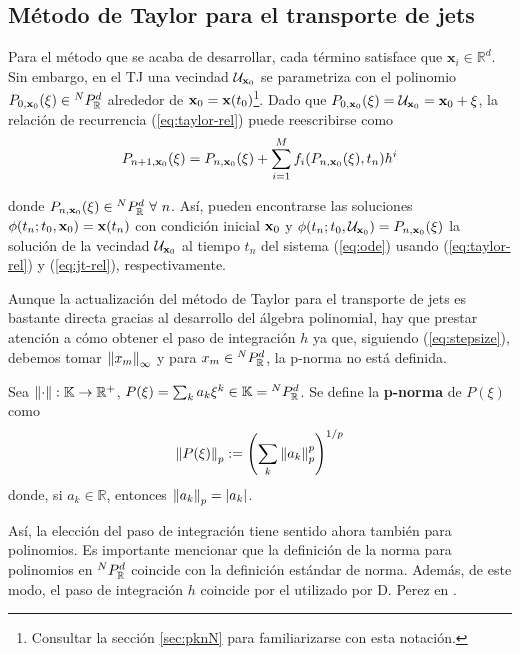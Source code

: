 \subsection{Método de Taylor para el transporte de jets}
Para el método que se acaba de desarrollar, cada término satisface que $\mathbf{x}_i \in \mathbb{R}^d$. Sin embargo, en el TJ una vecindad $\mathcal{U}_{\mathbf{x}_0}$ se parametriza con el polinomio $P_{0,\mathbf{x}_0}(\mathbf{\xi}) \in {^{N}P_{\mathbb{R}}^ d }$ alrededor de $\mathbf{x}_0 = \mathbf{x}(t_0)$\footnote{Consultar la sección \ref{sec:pknN} para familiarizarse con esta notación.}. Dado que $P_{0,\mathbf{x}_0}(\mathbf{\xi}) = \mathcal{U}_{\mathbf{x}_0} = \mathbf{x}_0 + \mathbf{\xi}$, la relación de recurrencia (\ref{eq:taylor-rel}) puede reescribirse como
\begin{equation}
P_{n+1,\mathbf{x}_0}(\xi) = P_{n,\mathbf{x}_0}(\xi) + \sum_{i=1}^M f_i(P_{n,\mathbf{x}_0}(\xi),t_n)h^i 
\label{eq:jt-rel}
\end{equation}

donde $P_{n,\xo}(\xi) \in \pkk{N}{d} \ \forall \ n$. Así, pueden encontrarse las soluciones $\phi(t_n;t_0,\mathbf{x}_0) = \mathbf{x}(t_n)$ con condición inicial $\mathbf{x}_0$ y $\phi(t_n;t_0,\mathcal{U}_{\mathbf{x}_0}) = P_{n,\mathbf{x}_0}(\xi)$ la solución de la vecindad $\mathcal{U}_{\mathbf{x}_0}$ al tiempo
$t_n$ del sistema (\ref{eq:ode}) usando (\ref{eq:taylor-rel}) y (\ref{eq:jt-rel}), respectivamente.

Aunque la actualización del método de Taylor para el transporte de jets es bastante directa gracias al desarrollo del álgebra polinomial, hay que prestar atención a cómo obtener el paso de integración $h$ ya que, siguiendo (\ref{eq:stepsize}), debemos tomar $\left\lVert x_m\right\rVert_\infty$ y para $x_m \in {^{N}P_{\mathbb{R}}^ d }$, la p-norma no está definida.

\begin{definicion}
Sea $\left\lVert\cdot\right\rVert : \mathbb{K} \to \mathbb{R}^+$, $P(\mathbf{\xi}) = \sum_{k} a_k \mathbf{\xi}^k \in \mathbb{K} = {^{N}P_{\mathbb{R}}^ d }$. Se define la \textbf{p-norma} de $P(\xi)$ como
\begin{equation}
 \left\lVert P(\mathbf{\xi})\right\rVert_p := \left( \sum_{k} \left\lVert a_k\right\rVert_p^p \right)^{1/p}
 \label{eq:poly-norm}
\end{equation}  
donde, si $a_k \in \mathbb{R}$, entonces $\left\lVert a_k\right\rVert_p = |a_k|$.
\end{definicion}

Así, la elección del paso de integración tiene sentido ahora también para polinomios. Es importante mencionar que la definición de la norma para polinomios en ${^{N}P_{\mathbb{R}}^ d }$ coincide con la definición estándar de norma. Además, de este modo, el paso de integración $h$ coincide por el utilizado por D. Perez en \cite{P-palau}.

